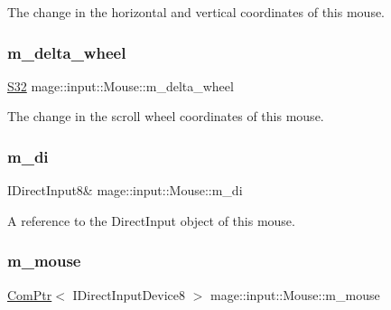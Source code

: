 The change in the horizontal and vertical coordinates of this mouse. \mbox{\label{classmage_1_1input_1_1_mouse_ab71a69d6a727b67065643d5dc929ee33}} 
\subsubsection{\texorpdfstring{m\+\_\+delta\+\_\+wheel}{m\_delta\_wheel}}
{\footnotesize\ttfamily \mbox{\hyperlink{namespacemage_a2ef1a005a77358f1825d13fd481b557f}{S32}} mage\+::input\+::\+Mouse\+::m\+\_\+delta\+\_\+wheel\hspace{0.3cm}{\ttfamily [private]}}

The change in the scroll wheel coordinates of this mouse. \mbox{\label{classmage_1_1input_1_1_mouse_a35e656946a3cbb7253abaeeec30642df}} 
\subsubsection{\texorpdfstring{m\+\_\+di}{m\_di}}
{\footnotesize\ttfamily I\+Direct\+Input8\& mage\+::input\+::\+Mouse\+::m\+\_\+di\hspace{0.3cm}{\ttfamily [private]}}

A reference to the Direct\+Input object of this mouse. \mbox{\label{classmage_1_1input_1_1_mouse_acce273ae24a5f7ba107f2f15618bbea6}} 
\subsubsection{\texorpdfstring{m\+\_\+mouse}{m\_mouse}}
{\footnotesize\ttfamily \mbox{\hyperlink{namespacemage_ae74f374780900893caa5555d1031fd79}{Com\+Ptr}}$<$ I\+Direct\+Input\+Device8 $>$ mage\+::input\+::\+Mouse\+::m\+\_\+mouse\hspace{0.3cm}{\ttfamily [private]}}

